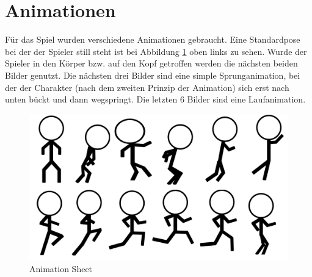 \section{Animationen}
Für das Spiel wurden verschiedene Animationen gebraucht. Eine Standardpose bei der der Spieler still steht ist bei Abbildung \ref*{AnimationSheet} oben links zu sehen.
Wurde der Spieler in den Körper bzw. auf den Kopf getroffen werden die nächsten beiden Bilder genutzt. Die nächsten drei Bilder sind eine simple Sprunganimation, bei der der Charakter (nach dem zweiten Prinzip der Animation) sich erst nach unten bückt und dann wegspringt.
Die letzten 6 Bilder sind eine Laufanimation.
\begin{figure}[H]
    \centering
    \includegraphics[scale=0.3]{pics/AnimationSheet.png}
    \caption{Animation Sheet}
    \label{AnimationSheet}
\end{figure}







